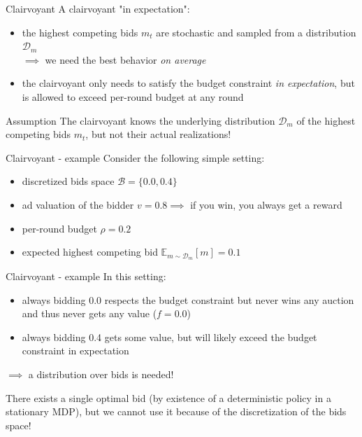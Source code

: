 \begin{frame}{Clairvoyant}
    A clairvoyant "in expectation":
    \begin{itemize}
        \item the highest competing bids $m_t$ are stochastic and sampled from a distribution $\mathcal{D}_m$ \\
        $\implies$ we need the best behavior \emph{on average}
        \item the clairvoyant only needs to satisfy the budget constraint \emph{in expectation}, but is allowed to exceed per-round budget at any round
    \end{itemize}
    
    \begin{block}{Assumption} 
    The clairvoyant knows the underlying distribution $\mathcal{D}_m$ of the highest competing bids $m_t$, but not their actual realizations!
    \end{block}
\end{frame}

\begin{frame}{Clairvoyant - example}
    Consider the following simple setting:
    \begin{itemize}
        \item discretized bids space $\mathcal{B} = \{0.0, 0.4\}$
        \item ad valuation of the bidder $v = 0.8 \implies$ if you win, you always get a reward
        \item per-round budget $\rho = 0.2$
        \item expected highest competing bid $\mathbb{E}_{m \sim \mathcal{D}_m}\left[m\right] = 0.1$
    \end{itemize}   
\end{frame}

\begin{frame}{Clairvoyant - example}
    In this setting:
    \begin{itemize}
        \item always bidding 0.0 respects the budget constraint but never wins any auction and thus never gets any value ($f = 0.0$)
        \item always bidding 0.4 gets some value, but will likely exceed the budget constraint in expectation
    \end{itemize}

    $\implies$ a distribution over bids is needed!

    \begin{block}{} 
        There exists a single optimal bid (by existence of a deterministic policy in a stationary MDP), but we cannot use it because of the discretization of the bids space!
    \end{block}
\end{frame}

